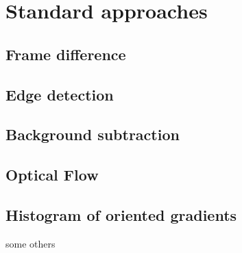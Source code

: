 \chapter{Standard approaches}

\section{Frame difference}
\section{Edge detection}
\section{Background subtraction}
\section{Optical Flow}
\section{Histogram of oriented gradients}

some others